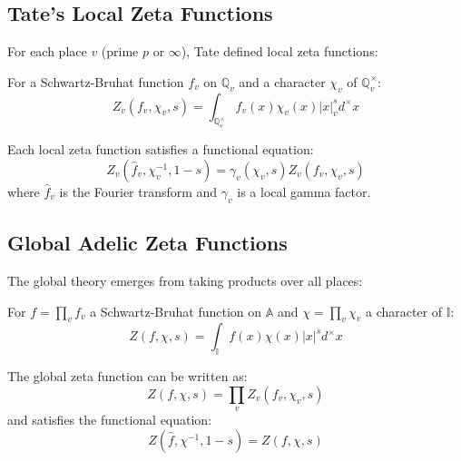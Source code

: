 \subsection{Tate's Local Zeta Functions}

For each place $v$ (prime $p$ or $\infty$), Tate defined local zeta functions:

\begin{definition}
For a Schwartz-Bruhat function $f_v$ on $\mathbb{Q}_v$ and a character $\chi_v$ of $\mathbb{Q}_v^{\times}$:
\begin{equation}
Z_v(f_v, \chi_v, s) = \int_{\mathbb{Q}_v^{\times}} f_v(x) \chi_v(x) |x|_v^s d^{\times}x
\end{equation}
\end{definition}

\begin{theorem}
Each local zeta function satisfies a functional equation:
\begin{equation}
Z_v(\hat{f}_v, \chi_v^{-1}, 1-s) = \gamma_v(\chi_v, s) Z_v(f_v, \chi_v, s)
\end{equation}
where $\hat{f}_v$ is the Fourier transform and $\gamma_v$ is a local gamma factor.
\end{theorem}

\subsection{Global Adelic Zeta Functions}

The global theory emerges from taking products over all places:

\begin{definition}
For $f = \prod_v f_v$ a Schwartz-Bruhat function on $\mathbb{A}$ and $\chi = \prod_v \chi_v$ a character of $\mathbb{I}$:
\begin{equation}
Z(f, \chi, s) = \int_{\mathbb{I}} f(x) \chi(x) |x|^s d^{\times}x
\end{equation}
\end{definition}

\begin{theorem}
The global zeta function can be written as:
\begin{equation}
Z(f, \chi, s) = \prod_v Z_v(f_v, \chi_v, s)
\end{equation}
and satisfies the functional equation:
\begin{equation}
Z(\hat{f}, \chi^{-1}, 1-s) = Z(f, \chi, s)
\end{equation}
\end{theorem}

